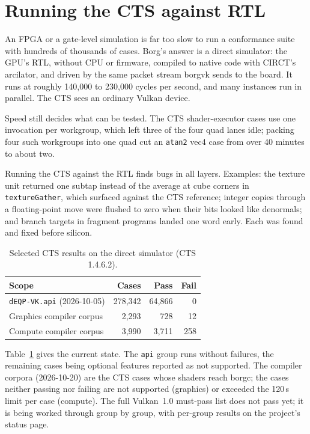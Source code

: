 \documentclass[sigconf,nonacm]{acmart}
\begin{document}
\section{Running the CTS against RTL}

An FPGA or a gate-level simulation is far too slow to run a conformance
suite with hundreds of thousands of cases. Borg's answer is a direct
simulator: the GPU's RTL, without CPU or firmware, compiled to native code
with CIRCT's arcilator, and driven by the same packet stream borgvk sends
to the board. It runs at roughly 140,000 to 230,000 cycles per second, and
many instances run in parallel. The CTS sees an ordinary Vulkan device.

Speed still decides what can be tested. The CTS shader-executor cases use
one invocation per workgroup, which left three of the four quad lanes idle;
packing four such workgroups into one quad cut an \texttt{atan2} vec4 case
from over 40 minutes to about two.

Running the CTS against the RTL finds bugs in all layers. Examples: the
texture unit returned one subtap instead of the average at cube corners in
\texttt{textureGather}, which surfaced against the CTS reference;
integer copies through a floating-point move were flushed to zero when
their bits looked like denormals; and branch targets in fragment programs
landed one word early. Each was found and fixed before silicon.

\begin{table}[t]
  \caption{Selected CTS results on the direct simulator (CTS 1.4.6.2).}
  \label{tab:cts}
  \small
  \begin{tabular}{lrrr}
    \toprule
    Scope & Cases & Pass & Fail \\
    \midrule
    \texttt{dEQP-VK.api} (2026-10-05) & 278,342 & 64,866 & 0 \\
    Graphics compiler corpus & 2,293 & 728 & 12 \\
    Compute compiler corpus & 3,990 & 3,711 & 258 \\
    \bottomrule
  \end{tabular}
\end{table}

Table~\ref{tab:cts} gives the current state. The \texttt{api} group runs
without failures, the remaining cases being optional features reported as
not supported. The compiler corpora (2026-10-20) are the CTS cases whose
shaders reach borgc; the cases neither passing nor failing are not supported
(graphics) or exceeded the 120\,s limit per case (compute). The full Vulkan~1.0 must-pass list does not pass yet; it is being
worked through group by group, with per-group results on the project's
status page.
\end{document}
